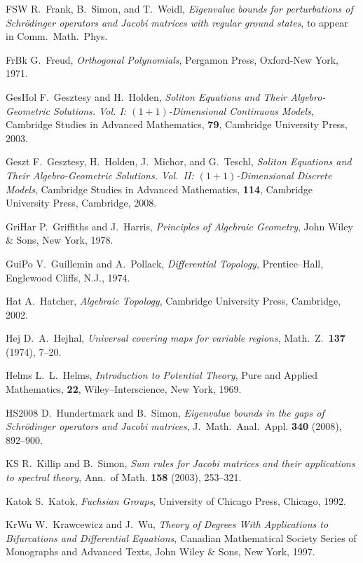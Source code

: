 \documentclass[reqno,centertags, 12pt]{amsart}
\numberwithin{equation}{section}
\theoremstyle{definition}
\begin{document}
\begin{thebibliography}{999}
{\bibitem}{FSW} R.~Frank, B.~Simon, and T.~Weidl, {\it Eigenvalue bounds
for perturbations of Schr\"odinger operators and Jacobi matrices
with regular ground states}, to appear in Comm.\ Math.\ Phys.

{\bibitem}{FrBk} G.~Freud, \textit{Orthogonal Polynomials}, Pergamon Press,
Oxford-New York, 1971.

{\bibitem}{GesHol} F.~Gesztesy and H.~Holden, \textit{Soliton Equations and
Their Algebro-Geometric Solutions. Vol. I: $(1+1)$-Dimensional
Continuous Models}, Cambridge Studies in Advanced Mathematics,
{\bf 79}, Cambridge University Press, 2003.

{\bibitem}{Geszt} F.~Gesztesy,  H.~Holden, J.~Michor, and G.~Teschl,
\textit{Soliton Equations and Their Algebro-Geometric Solutions.
Vol.\ II: $(1+1)$-Dimensional Discrete Models}, Cambridge Studies in
Advanced Mathematics, {\bf 114}, Cambridge University Press, Cambridge,
2008.

{\bibitem}{GriHar} P.~Griffiths and J.~Harris, \textit{Principles of
Algebraic Geometry}, John Wiley \& Sons, New York, 1978.

{\bibitem}{GuiPo} V.~Guillemin and A.~Pollack, \textit{Differential
Topology}, Prentice--Hall, Englewood Cliffs, N.J., 1974.

{\bibitem}{Hat} A.~Hatcher, \textit{Algebraic Topology}, Cambridge
University Press, Cambridge, 2002.

{\bibitem}{Hej} D.~A.~Hejhal, {\it Universal covering maps for variable
regions}, Math.\ Z.\ {\bf 137} (1974), 7--20.

{\bibitem}{Helms} L.~L.~Helms, \textit{Introduction to Potential Theory},
Pure and Applied Mathematics, {\bf 22}, Wiley--Interscience, New
York, 1969.

{\bibitem}{HS2008} D.~Hundertmark and B.~Simon, {\it Eigenvalue bounds in
the gaps of Schr\"odinger operators and Jacobi matrices}, J.\ Math.\
Anal.\ Appl. {\bf 340} (2008), 892--900.

{\bibitem}{KS} R.~Killip and B.~Simon, {\it Sum rules for Jacobi matrices
and their applications to spectral theory}, Ann.\ of Math. {\bf 158}
(2003), 253--321.

{\bibitem}{Katok} S.~Katok, \textit{Fuchsian Groups}, University of Chicago
Press, Chicago, 1992.

{\bibitem}{KrWu} W.~Krawcewicz and J.~Wu, \textit{Theory of Degrees With
Applications to Bifurcations and Differential Equations}, Canadian
Mathematical Society Series of Monographs and Advanced Texts, John
Wiley \& Sons, New York, 1997.


\end{thebibliography}
\end{document}

